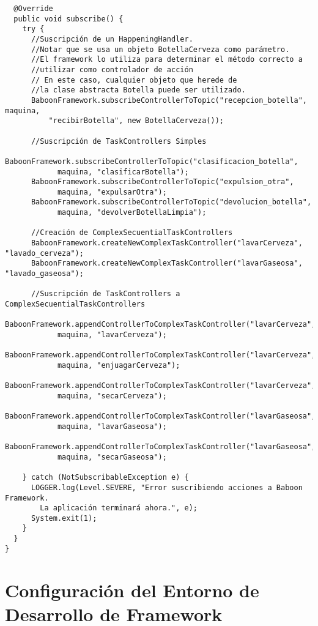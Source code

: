 \begin{verbatim}
  @Override
  public void subscribe() {
    try {
      //Suscripción de un HappeningHandler.
      //Notar que se usa un objeto BotellaCerveza como parámetro.
      //El framework lo utiliza para determinar el método correcto a
      //utilizar como controlador de acción
      // En este caso, cualquier objeto que herede de
      //la clase abstracta Botella puede ser utilizado.
      BaboonFramework.subscribeControllerToTopic("recepcion_botella", maquina,
          "recibirBotella", new BotellaCerveza());

      //Suscripción de TaskControllers Simples
      BaboonFramework.subscribeControllerToTopic("clasificacion_botella", 
            maquina, "clasificarBotella");
      BaboonFramework.subscribeControllerToTopic("expulsion_otra", 
            maquina, "expulsarOtra");
      BaboonFramework.subscribeControllerToTopic("devolucion_botella", 
            maquina, "devolverBotellaLimpia");

      //Creación de ComplexSecuentialTaskControllers
      BaboonFramework.createNewComplexTaskController("lavarCerveza", "lavado_cerveza");
      BaboonFramework.createNewComplexTaskController("lavarGaseosa", "lavado_gaseosa");

      //Suscripción de TaskControllers a ComplexSecuentialTaskControllers
      BaboonFramework.appendControllerToComplexTaskController("lavarCerveza", 
            maquina, "lavarCerveza");
      BaboonFramework.appendControllerToComplexTaskController("lavarCerveza", 
            maquina, "enjuagarCerveza");
      BaboonFramework.appendControllerToComplexTaskController("lavarCerveza", 
            maquina, "secarCerveza");
      BaboonFramework.appendControllerToComplexTaskController("lavarGaseosa", 
            maquina, "lavarGaseosa");
      BaboonFramework.appendControllerToComplexTaskController("lavarGaseosa",
            maquina, "secarGaseosa");

    } catch (NotSubscribableException e) {
      LOGGER.log(Level.SEVERE, "Error suscribiendo acciones a Baboon Framework.
        La aplicación terminará ahora.", e);
      System.exit(1);
    }
  }
}
\end{verbatim}

\section {Configuración del Entorno de Desarrollo de \nombreFramework Framework}
\label{config_baboon_env}

